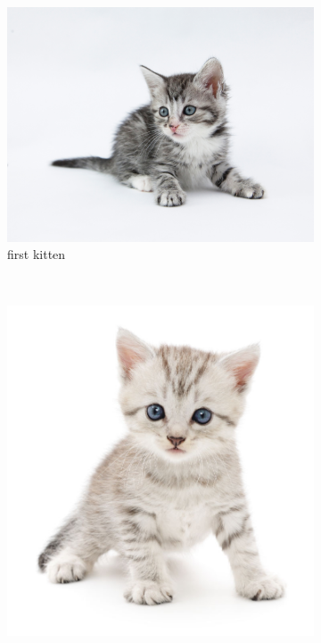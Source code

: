 \documentclass[12pt]{article}
\begin{document}
\begin{figure}[!b]
    \centering
    \begin{subfigure}[b]{0.3\textwidth}
        \includegraphics[width=\textwidth]{./kitten2.jpg}
        \caption{first kitten}
        \label{fig:gull}
    \end{subfigure}
    ~ %
    \begin{subfigure}[b]{0.3\textwidth}
        \includegraphics[width=\textwidth]{./kitten3.jpg}

\end{subfigure}
\end{figure}
\end{document}
